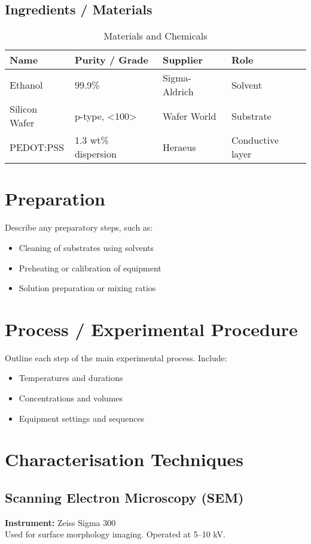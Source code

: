 \documentclass[12pt,a4paper]{article}
\begin{document}
\subsection{Ingredients / Materials}
\begin{table}[H]
    \centering
    \caption{Materials and Chemicals}
    \begin{tabular}{@{}llll@{}}
        \toprule
        \textbf{Name} & \textbf{Purity / Grade} & \textbf{Supplier} & \textbf{Role} \\
        \midrule
        Ethanol & 99.9\% & Sigma-Aldrich & Solvent \\
        Silicon Wafer & p-type, \textless100\textgreater & Wafer World & Substrate \\
        PEDOT:PSS & 1.3 wt\% dispersion & Heraeus & Conductive layer \\
        \bottomrule
    \end{tabular}
\end{table}

\section{Preparation}
Describe any preparatory steps, such as:
\begin{itemize}
    \item Cleaning of substrates using solvents
    \item Preheating or calibration of equipment
    \item Solution preparation or mixing ratios
\end{itemize}

\section{Process / Experimental Procedure}
Outline each step of the main experimental process. Include:
\begin{itemize}
    \item Temperatures and durations
    \item Concentrations and volumes
    \item Equipment settings and sequences
\end{itemize}

\section{Characterisation Techniques}
\subsection*{Scanning Electron Microscopy (SEM)}
\textbf{Instrument:} Zeiss Sigma 300 \\
Used for surface morphology imaging. Operated at 5–10 kV. 
\end{document}
